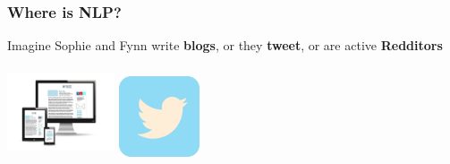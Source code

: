 \begin{frame}
  \frametitle{Where is NLP?}
  Imagine Sophie and Fynn write \textbf{blogs}, or they \textbf{tweet}, or are active \textbf{Redditors}
  \begin{center}
  \includegraphics[width=120,height=100, keepaspectratio]{fig/blog.jpg}
  \includegraphics[width=90,height=90, keepaspectratio]{fig/twitter1.png}
  \hspace{3cm}

\end{center}
\end{frame}
